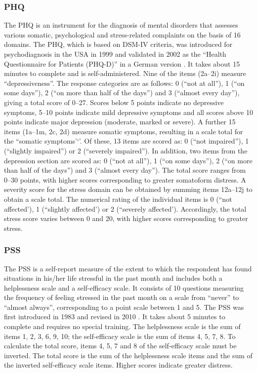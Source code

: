 \subsubsection{\acf{PHQ}}
\label{questionnaires:PHQ}
The \acs{PHQ} is an instrument for the diagnosis of mental disorders that assesses various somatic, psychological and stress-related complaints on the basis of 16 domains. The \acs{PHQ}, which is based on DSM-IV criteria, was introduced for psychodiagnosis in the USA in 1999 \cite{spitzer1999phq} and validated in 2002 as the ``Health Questionnaire for Patients (PHQ-D)'' in a German version \cite{lowe2002phq}. It takes about 15 minutes to complete and is self-administered. Nine of the items (2a--2i) measure ``depressiveness''. The response categories are as follows: 0 (``not at all''), 1 (``on some days''), 2 (``on more than half of the days'') and 3 (``almost every day''), giving a total score of 0--27. Scores below 5 points indicate no depressive symptoms, 5--10 points indicate mild depressive symptoms and all scores above 10 points indicate major depression (moderate, marked or severe). A further 15 items (1a--1m, 2c, 2d) measure somatic symptoms, resulting in a scale total for the ``somatic symptoms'`'. Of these, 13 items are scored as: 0 (``not impaired''), 1 (``slightly impaired'') or 2 (``severely impaired''). In addition, two items from the depression section are scored as: 0 (``not at all''), 1 (``on some days''), 2 (``on more than half of the days'') and 3 (``almost every day''). The total score ranges from 0--30 points, with higher scores corresponding to greater somatoform distress. 
A severity score for the stress domain can be obtained by summing items 12a--12j to obtain a scale total. The numerical rating of the individual items is 0 (``not affected'), 1 (``slightly affected') or 2 (``severely affected'). Accordingly, the total stress score varies between 0 and 20, with higher scores corresponding to greater stress.

\QPsychometrics{}

\subsubsection{\acf{PSS}}
\label{questionnaires:PSS}
The \ac{PSS} is a self-report measure of the extent to which the respondent has found situations in his/her life stressful in the past month and includes both a helplessness scale and a self-efficacy scale. It consists of 10 questions measuring the frequency of feeling stressed in the past month on a scale from ``never'' to ``almost always'', corresponding to a point scale between 1 and 5. The \ac{PSS} was first introduced in 1983 \cite{cohen1983pss} and revised in 2010 \cite{schneider2020pss}. It takes about 5 minutes to complete and requires no special training. The helplessness scale is the sum of items 1, 2, 3, 6, 9, 10; the self-efficacy scale is the sum of items 4, 5, 7, 8. To calculate the total score, items 4, 5, 7 and 8 of the self-efficacy scale must be inverted. The total score is the sum of the helplessness scale items and the sum of the inverted self-efficacy scale items. Higher scores indicate greater distress.

